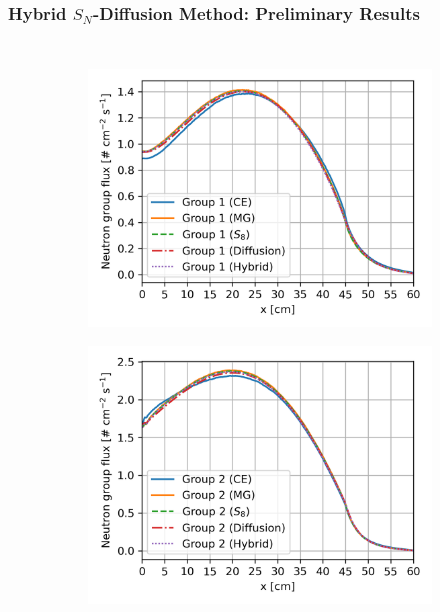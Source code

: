 \begin{frame}
  \frametitle{Hybrid $S_N$-Diffusion Method: Preliminary Results}
  \begin{columns}
    \column{8cm}
    \begin{figure}
      \centering
      \begin{subfigure}[t]{.45\textwidth}
        \centering
        \includegraphics[width=\textwidth]{../images/case-3b-group-1-flux}
        \label{fig:c3bg1}
      \end{subfigure}
      \begin{subfigure}[t]{.45\textwidth}
        \centering
        \includegraphics[width=\textwidth]{../images/case-3b-group-2-flux}
        \label{fig:c3bg2}

\end{subfigure}
\end{figure}
\end{columns}
\end{frame}
